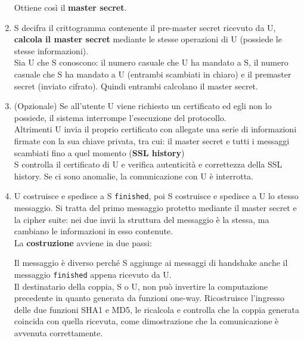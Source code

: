\documentclass[10pt]{book}
\begin{document}
\begin{list}{}{}
\begin{enumerate}
		Ottiene così il \textbf{master secret}.
		\item S decifra il crittogramma contenente il pre-master secret ricevuto da U, \textbf{calcola il master secret} mediante le stesse operazioni di U (possiede le stesse informazioni).\\
		Sia U che S conoscono: il numero casuale che U ha mandato a S, il numero casuale che S ha mandato a U (entrambi scambiati in chiaro) e il premaster secret (inviato cifrato). Quindi entrambi calcolano il master secret.
		\item (Opzionale) Se all'utente U viene richiesto un certificato ed egli non lo possiede, il sistema interrompe l'esecuzione del protocollo.\\
		Altrimenti U invia il proprio certificato con allegate una serie di informazioni firmate con la sua chiave privata, tra cui: il master secret e tutti i messaggi scambiati fino a quel momento (\textbf{SSL history})\\
		S controlla il certificato di U e verifica autenticità e correttezza della SSL history. Se ci sono anomalie, la comunicazione con U è interrotta.
		\item U costruisce e spedisce a S \texttt{finished}, poi S costruisce e spedisce a U lo stesso messaggio. Si tratta del primo messaggio protetto mediante il master secret e la cipher suite: nei due invii la struttura del messaggio è la stessa, ma cambiano le informazioni in esso contenute.\\
		La \textbf{costruzione} avviene in due passi:
		Il messaggio è diverso perché S aggiunge ai messaggi di handshake anche il messaggio \texttt{finished} appena ricevuto da U.\\
	Il destinatario della coppia, S o U, non può invertire la computazione precedente in quanto generata da funzioni one-way. Ricostruisce l'ingresso delle due funzioni SHA1 e MD5, le ricalcola e controlla che la coppia generata coincida con quella ricevuta, come dimostrazione che la comunicazione è avvenuta correttamente.
	\end{enumerate}

\end{list}
\end{document}
